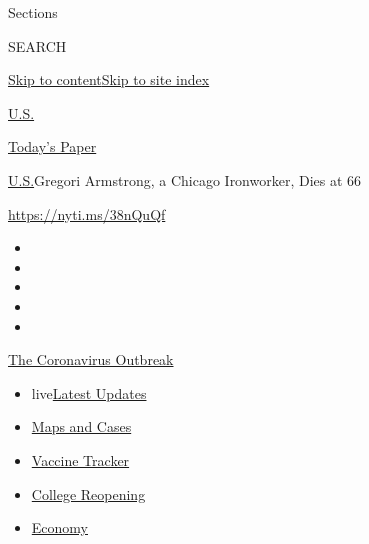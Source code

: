 Sections

SEARCH

\protect\hyperlink{site-content}{Skip to
content}\protect\hyperlink{site-index}{Skip to site index}

\href{https://www.nytimes.com/section/us}{U.S.}

\href{https://myaccount.nytimes.com/auth/login?response_type=cookie\&client_id=vi}{}

\href{https://www.nytimes.com/section/todayspaper}{Today's Paper}

\href{/section/us}{U.S.}\textbar{}Gregori Armstrong, a Chicago
Ironworker, Dies at 66

\url{https://nyti.ms/38nQuQf}

\begin{itemize}
\item
\item
\item
\item
\item
\end{itemize}

\href{https://www.nytimes.com/news-event/coronavirus?action=click\&pgtype=Article\&state=default\&region=TOP_BANNER\&context=storylines_menu}{The
Coronavirus Outbreak}

\begin{itemize}
\tightlist
\item
  live\href{https://www.nytimes.com/2020/08/03/world/coronavirus-covid-19.html?action=click\&pgtype=Article\&state=default\&region=TOP_BANNER\&context=storylines_menu}{Latest
  Updates}
\item
  \href{https://www.nytimes.com/interactive/2020/us/coronavirus-us-cases.html?action=click\&pgtype=Article\&state=default\&region=TOP_BANNER\&context=storylines_menu}{Maps
  and Cases}
\item
  \href{https://www.nytimes.com/interactive/2020/science/coronavirus-vaccine-tracker.html?action=click\&pgtype=Article\&state=default\&region=TOP_BANNER\&context=storylines_menu}{Vaccine
  Tracker}
\item
  \href{https://www.nytimes.com/2020/08/02/us/covid-college-reopening.html?action=click\&pgtype=Article\&state=default\&region=TOP_BANNER\&context=storylines_menu}{College
  Reopening}
\item
  \href{https://www.nytimes.com/live/2020/08/03/business/stock-market-today-coronavirus?action=click\&pgtype=Article\&state=default\&region=TOP_BANNER\&context=storylines_menu}{Economy}
\end{itemize}

